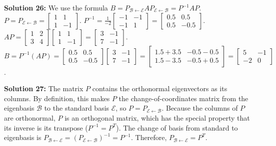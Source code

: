 \documentclass[11pt]{article}
\begin{document}
\vspace{0.5cm}
\textbf{Solution 26:} We use the formula $B = P_{\mathcal{B} \leftarrow \mathcal{E}} A P_{\mathcal{E} \leftarrow \mathcal{B}} = P^{-1} A P$.
$P = P_{\mathcal{E} \leftarrow \mathcal{B}} = \begin{bmatrix} 1 & 1 \\ 1 & -1 \end{bmatrix}$.
$P^{-1} = \frac{1}{-2} \begin{bmatrix} -1 & -1 \\ -1 & 1 \end{bmatrix} = \begin{bmatrix} 0.5 & 0.5 \\ 0.5 & -0.5 \end{bmatrix}$.
$AP = \begin{bmatrix} 1 & 2 \\ 3 & 4 \end{bmatrix} \begin{bmatrix} 1 & 1 \\ 1 & -1 \end{bmatrix} = \begin{bmatrix} 3 & -1 \\ 7 & -1 \end{bmatrix}$.
$B = P^{-1} (AP) = \begin{bmatrix} 0.5 & 0.5 \\ 0.5 & -0.5 \end{bmatrix} \begin{bmatrix} 3 & -1 \\ 7 & -1 \end{bmatrix} = \begin{bmatrix} 1.5 + 3.5 & -0.5 - 0.5 \\ 1.5 - 3.5 & -0.5 + 0.5 \end{bmatrix} = \begin{bmatrix} 5 & -1 \\ -2 & 0 \end{bmatrix}$.

\vspace{0.5cm}
\textbf{Solution 27:} The matrix $P$ contains the orthonormal eigenvectors as its columns. By definition, this makes $P$ the change-of-coordinates matrix from the eigenbasis $\mathcal{B}$ to the standard basis $\mathcal{E}$, so $P = P_{\mathcal{E} \leftarrow \mathcal{B}}$.
Because the columns of $P$ are orthonormal, $P$ is an orthogonal matrix, which has the special property that its inverse is its transpose ($P^{-1} = P^T$).
The change of basis from standard to eigenbasis is $P_{\mathcal{B} \leftarrow \mathcal{E}} = (P_{\mathcal{E} \leftarrow \mathcal{B}})^{-1} = P^{-1}$.
Therefore, $P_{\mathcal{B} \leftarrow \mathcal{E}} = P^T$.
\end{document}

